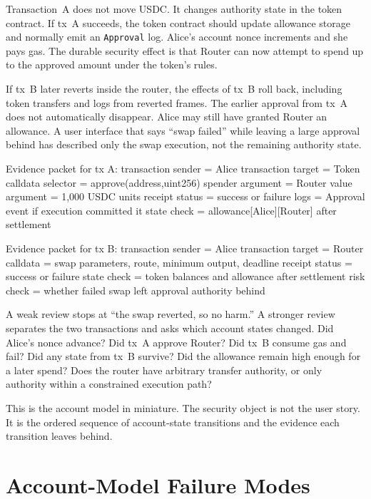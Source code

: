 Transaction~A does not move USDC. It changes authority state in the token contract. If tx~A succeeds, the token contract should update allowance storage and normally emit an \texttt{Approval} log. Alice's account nonce increments and she pays gas. The durable security effect is that Router can now attempt to spend up to the approved amount under the token's rules.

If tx~B later reverts inside the router, the effects of tx~B roll back, including token transfers and logs from reverted frames. The earlier approval from tx~A does not automatically disappear. Alice may still have granted Router an allowance. A user interface that says ``swap failed'' while leaving a large approval behind has described only the swap execution, not the remaining authority state.

\begin{codeblock}
Evidence packet for tx A:
    transaction sender = Alice
    transaction target = Token
    calldata selector = approve(address,uint256)
    spender argument = Router
    value argument = 1,000 USDC units
    receipt status = success or failure
    logs = Approval event if execution committed it
    state check = allowance[Alice][Router] after settlement

Evidence packet for tx B:
    transaction sender = Alice
    transaction target = Router
    calldata = swap parameters, route, minimum output, deadline
    receipt status = success or failure
    state check = token balances and allowance after settlement
    risk check = whether failed swap left approval authority behind
\end{codeblock}

A weak review stops at ``the swap reverted, so no harm.'' A stronger review separates the two transactions and asks which account states changed. Did Alice's nonce advance? Did tx~A approve Router? Did tx~B consume gas and fail? Did any state from tx~B survive? Did the allowance remain high enough for a later spend? Does the router have arbitrary transfer authority, or only authority within a constrained execution path?

This is the account model in miniature. The security object is not the user story. It is the ordered sequence of account-state transitions and the evidence each transition leaves behind.

\section{Account-Model Failure Modes}

